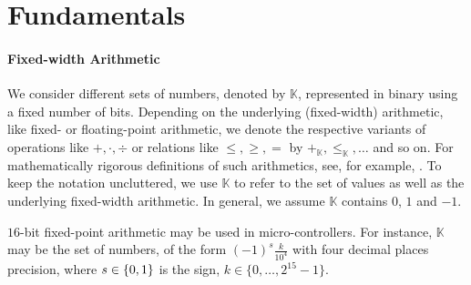 








\section{Fundamentals}
\label{sec:fundamentals}

\newcommand{\setnumbers}{\mathbb K}
% 

\paragraph{Fixed-width Arithmetic} We consider different sets of numbers, denoted by $\setnumbers$, represented in binary using a fixed number of bits. Depending on the underlying (fixed-width) arithmetic, like fixed- or floating-point arithmetic, we denote the respective variants of operations like $+, \cdot, \div$ or relations like $\leq, \geq, =$ by $+_\setnumbers, \leq_\setnumbers, \dots$ and so on. For mathematically rigorous definitions of such arithmetics, see, for example,
\citet{Ercegovac2004,Goldberg91}.
To keep the notation uncluttered, we use $\setnumbers$ to refer to the
set of values as well as the underlying fixed-width arithmetic.
In general, we assume $\setnumbers$ contains $0$, $1$ and $-1$.



\begin{example}
\label{example:fixedpointarithmetic}
$16$-bit fixed-point arithmetic may be used in micro-controllers. For instance, $\setnumbers$ may be the set of numbers, of the form 
    $(-1)^s\frac{k}{10^{4}}$ with four decimal places precision,
    where $s \in {\{0, 1\}}$ is the sign, $k \in \{0, \dots, 2^{15}-1\}$.
\end{example}

